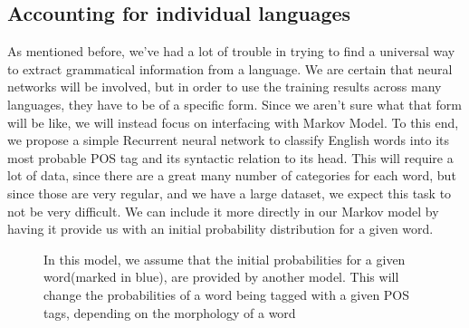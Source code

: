 \subsection{Accounting for individual languages}
As mentioned before, we've had a lot of trouble in trying to find a universal way to extract grammatical information from a language. We are certain that
neural networks will be involved, but in order to use the training results across many languages, they have to be of a specific form. Since we aren't sure
what that form will be like, we will instead focus on interfacing with Markov Model. To this end, we propose a simple Recurrent neural network to classify
English words into its most probable POS tag and its syntactic relation to its head. This will require a lot of data, since there are a great many number of categories for each word, but since those are very regular, and we have a large dataset, we expect this task to not be very difficult. We can include it more directly
in our Markov model by having it provide us with an initial probability distribution for a given word.

\begin{figure}[h!]
\center
{}
\label{mark:synt}
\caption{In this model, we assume that the initial probabilities for a given word(marked in blue), are provided by another model. This will change the probabilities of a word being tagged with a given POS tags, depending on the morphology of a word}
\end{figure}

